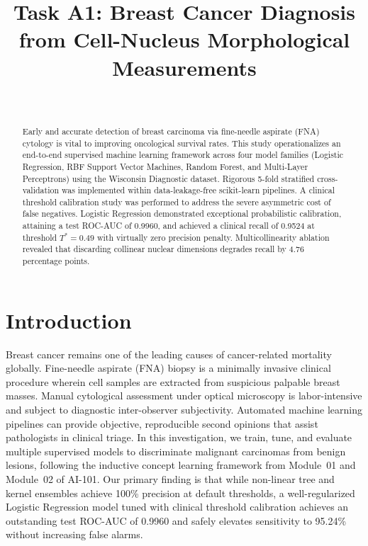 \documentclass[10pt,journal,compsoc,twocolumn]{IEEEtran}
\begin{document}
\title{Task A1: Breast Cancer Diagnosis from Cell-Nucleus Morphological Measurements}

\author{
    \\
}

\maketitle

\begin{abstract}
Early and accurate detection of breast carcinoma via fine-needle aspirate (FNA) cytology is vital to improving oncological survival rates. This study operationalizes an end-to-end supervised machine learning framework across four model families (Logistic Regression, RBF Support Vector Machines, Random Forest, and Multi-Layer Perceptrons) using the Wisconsin Diagnostic dataset. Rigorous 5-fold stratified cross-validation was implemented within data-leakage-free scikit-learn pipelines. A clinical threshold calibration study was performed to address the severe asymmetric cost of false negatives. Logistic Regression demonstrated exceptional probabilistic calibration, attaining a test ROC-AUC of 0.9960, and achieved a clinical recall of 0.9524 at threshold $T^* = 0.49$ with virtually zero precision penalty. Multicollinearity ablation revealed that discarding collinear nuclear dimensions degrades recall by 4.76 percentage points.
\end{abstract}

\section{Introduction}
Breast cancer remains one of the leading causes of cancer-related mortality globally. Fine-needle aspirate (FNA) biopsy is a minimally invasive clinical procedure wherein cell samples are extracted from suspicious palpable breast masses. Manual cytological assessment under optical microscopy is labor-intensive and subject to diagnostic inter-observer subjectivity. Automated machine learning pipelines can provide objective, reproducible second opinions that assist pathologists in clinical triage. In this investigation, we train, tune, and evaluate multiple supervised models to discriminate malignant carcinomas from benign lesions, following the inductive concept learning framework from Module~01 and Module~02 of AI-101. Our primary finding is that while non-linear tree and kernel ensembles achieve 100\% precision at default thresholds, a well-regularized Logistic Regression model tuned with clinical threshold calibration achieves an outstanding test ROC-AUC of 0.9960 and safely elevates sensitivity to 95.24\% without increasing false alarms.
\end{document}
